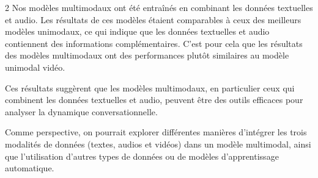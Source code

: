 \documentclass[a4paper]{llncs}
\begin{document}
\begin{multicols}{2}
Nos modèles multimodaux ont été entraînés en combinant les données textuelles et audio. 
Les résultats de ces modèles étaient comparables à ceux des meilleurs modèles unimodaux, ce qui indique que les données textuelles et audio contiennent des informations complémentaires.
C'est pour cela que les résultats des modèles multimodaux ont des performances plutôt similaires au modèle unimodal vidéo. 

Ces résultats suggèrent que les modèles multimodaux, en particulier ceux qui combinent les données textuelles et audio, peuvent être des outils efficaces pour analyser la dynamique conversationnelle. 

Comme perspective, on pourrait explorer différentes manières d'intégrer les trois modalités de données (textes, audios et vidéos) dans un modèle multimodal, 
ainsi que l'utilisation d'autres types de données ou de modèles d'apprentissage automatique. 

\printbibliography

\end{multicols}
\end{document}
